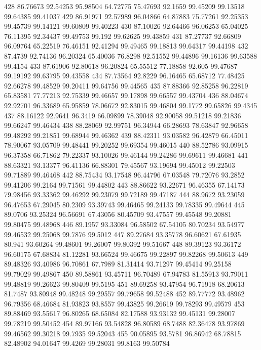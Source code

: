 428	86.76673	92.54253	95.98504	64.72775	75.47693	92.1659	99.45209	99.13518	99.64385	99.41037
429	86.91971	92.57989	96.04866	64.87883	75.77261	92.25353	99.45739	99.14121	99.60809	99.40223
430	87.10026	92.64466	96.06253	65.04025	76.11395	92.34437	99.49753	99.192	99.62625	99.43859
431	87.27737	92.66809	96.09764	65.22519	76.46151	92.41294	99.49465	99.18813	99.64317	99.44198
432	87.4739	92.74136	96.20324	65.40036	76.8298	92.51552	99.44896	99.16136	99.63588	99.4154
433	87.61906	92.80618	96.20824	65.55512	77.18858	92.605	99.47687	99.19192	99.63795	99.43558
434	87.73564	92.8229	96.16465	65.68712	77.48425	92.66278	99.48529	99.20411	99.64756	99.44565
435	87.88366	92.85258	96.22819	65.83581	77.77213	92.75339	99.46657	99.17898	99.66557	99.43704
436	88.04674	92.92701	96.33689	65.95859	78.06672	92.83015	99.46804	99.1772	99.65826	99.4345
437	88.16122	92.9641	96.3419	66.09899	78.39048	92.90058	99.51218	99.21836	99.66247	99.46434
438	88.28069	92.99751	96.34944	66.28693	78.63847	92.96658	99.48292	99.21851	99.68944	99.46362
439	88.42311	93.03582	96.42879	66.45011	78.90067	93.05709	99.48441	99.20252	99.69354	99.46015
440	88.52786	93.09915	96.37358	66.71862	79.22337	93.10026	99.46144	99.24286	99.69611	99.46681
441	88.63321	93.13377	96.41136	66.88301	79.45567	93.19694	99.45012	99.22503	99.71889	99.46468
442	88.75434	93.17548	96.44796	67.03548	79.72076	93.2852	99.41206	99.2164	99.71561	99.44802
443	88.86622	93.22671	96.46355	67.14173	79.98456	93.33362	99.46292	99.23079	99.72189	99.47187
444	88.9672	93.23059	96.47653	67.29045	80.2309	93.39743	99.46465	99.24133	99.78335	99.49644
445	89.0706	93.25324	96.56691	67.43056	80.45709	93.47557	99.45548	99.20881	99.80475	99.48968
446	89.1957	93.33084	96.58502	67.54105	80.70234	93.54977	99.46532	99.25068	99.7876	99.5012
447	89.27684	93.35778	96.60621	67.61935	80.941	93.60264	99.48601	99.26007	99.80392	99.51667
448	89.39123	93.36172	96.60175	67.68834	81.12281	93.66524	99.46675	99.22897	99.82268	99.50613
449	89.48326	93.40986	96.70861	67.7989	81.31414	93.71297	99.45414	99.25158	99.79029	99.49867
450	89.58861	93.45711	96.70489	67.94783	81.55913	93.79011	99.48819	99.26623	99.80409	99.5195
451	89.69258	93.47954	96.71918	68.20613	81.7487	93.80948	99.48248	99.29557	99.79658	99.52488
452	89.77772	93.48962	96.79356	68.46684	81.93823	93.8557	99.43825	99.26619	99.78293	99.49579
453	89.88469	93.55617	96.80265	68.65084	82.17588	93.93132	99.45131	99.28007	99.78219	99.50452
454	89.97166	93.54828	96.80589	68.7488	82.36478	93.97869	99.46562	99.30218	99.7935	99.52043
455	90.05895	93.5781	96.86942	68.78815	82.48902	94.01647	99.4269	99.28031	99.8163	99.50784
